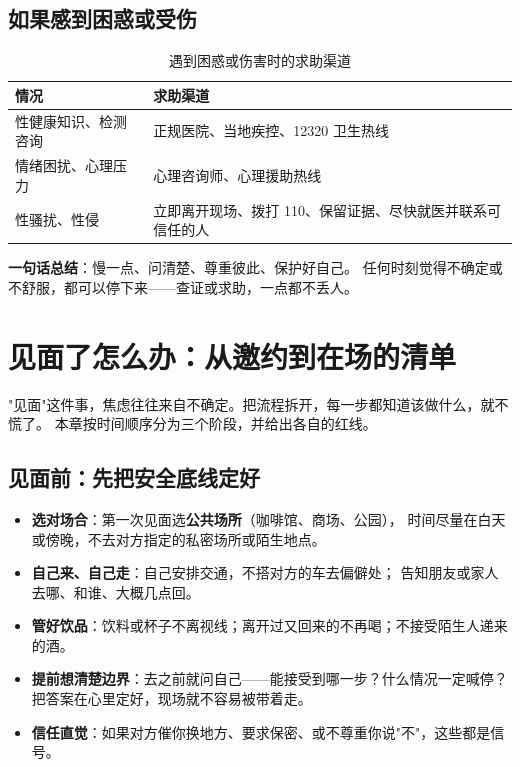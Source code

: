 \documentclass[12pt,UTF8,openany]{ctexbook}
\begin{document}
\section{如果感到困惑或受伤}

\begin{table}[htbp]
  \centering
  \caption{遇到困惑或伤害时的求助渠道}
  \begin{tabularx}{\textwidth}{@{}l X@{}}
    \toprule
    \textbf{情况} & \textbf{求助渠道} \\
    \midrule
    性健康知识、检测咨询 & 正规医院、当地疾控、12320 卫生热线 \\
    情绪困扰、心理压力 & 心理咨询师、心理援助热线 \\
    性骚扰、性侵 & 立即离开现场、拨打 110、保留证据、尽快就医并联系可信任的人 \\
    \bottomrule
  \end{tabularx}
\end{table}

\noindent\textbf{一句话总结}：慢一点、问清楚、尊重彼此、保护好自己。
任何时刻觉得不确定或不舒服，都可以停下来——查证或求助，一点都不丢人。

\chapter{见面了怎么办：从邀约到在场的清单}
\label{chap:meeting}

"见面"这件事，焦虑往往来自不确定。把流程拆开，每一步都知道该做什么，就不慌了。
本章按时间顺序分为三个阶段，并给出各自的红线。

\section{见面前：先把安全底线定好}

\begin{itemize}[leftmargin=2em]
  \item \textbf{选对场合}：第一次见面选\textbf{公共场所}（咖啡馆、商场、公园），
        时间尽量在白天或傍晚，不去对方指定的私密场所或陌生地点。
  \item \textbf{自己来、自己走}：自己安排交通，不搭对方的车去偏僻处；
        告知朋友或家人去哪、和谁、大概几点回。
  \item \textbf{管好饮品}：饮料或杯子不离视线；离开过又回来的不再喝；不接受陌生人递来的酒。
  \item \textbf{提前想清楚边界}：去之前就问自己——能接受到哪一步？什么情况一定喊停？
        把答案在心里定好，现场就不容易被带着走。
  \item \textbf{信任直觉}：如果对方催你换地方、要求保密、或不尊重你说"不"，这些都是信号。
\end{itemize}
\end{document}
